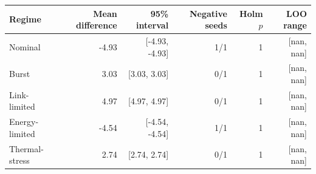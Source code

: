\begin{tabular}{lrrrrr}
\toprule
Regime & Mean difference & 95\% interval & Negative seeds & Holm $p$ & LOO range \\
\midrule
Nominal & -4.93 & [-4.93, -4.93] & 1/1 & 1 & [nan, nan] \\
Burst & 3.03 & [3.03, 3.03] & 0/1 & 1 & [nan, nan] \\
Link-limited & 4.97 & [4.97, 4.97] & 0/1 & 1 & [nan, nan] \\
Energy-limited & -4.54 & [-4.54, -4.54] & 1/1 & 1 & [nan, nan] \\
Thermal-stress & 2.74 & [2.74, 2.74] & 0/1 & 1 & [nan, nan] \\
\bottomrule
\end{tabular}